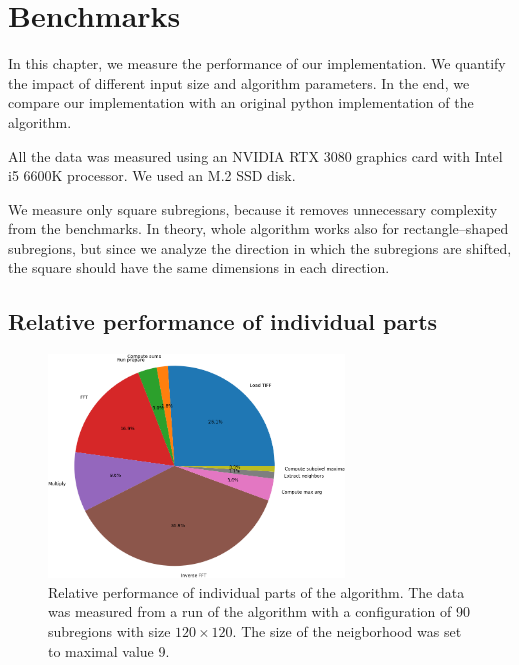 \chapter{Benchmarks}

In this chapter, we measure the performance of our implementation. We quantify the impact of different input size and algorithm parameters. In the end, we compare our implementation with an original python implementation of the algorithm.

All the data was measured using an NVIDIA RTX 3080 graphics card with Intel i5 6600K processor. We used an M.2 SSD disk.


We measure only square subregions, because it removes unnecessary complexity from the benchmarks. In theory, whole algorithm works also for rectangle--shaped subregions, but since we analyze the direction in which the subregions are shifted, the square should have the same dimensions in each direction.

\section{Relative performance of individual parts}

\begin{figure}
	\centering
	\includegraphics[width=0.7\textwidth]{img/eval/individual-parts}
	\caption{Relative performance of individual parts of the algorithm. The data was measured from a run of the algorithm with a configuration of 90 subregions with size $120 \times 120$. The size of the neigborhood was set to maximal value 9. }
	\label{individual-parts}
\end{figure}


